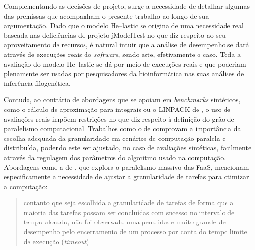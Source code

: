 \documentclass[english,brazilian]{UNISINOSmonografia} %
\begin{document}
Complementando as decisões de projeto, surge a necessidade de detalhar algumas das premissas que acompanham o presente trabalho ao longo de sua argumentação.
%
Dado que o modelo \textsf{He}--lastic se origina de uma necessidade real baseada nas deficiências do projeto jModelTest no que diz respeito ao seu aproveitamento de recursos, é natural intuir que a análise de desempenho se dará através de execuções reais do \textit{software}, sendo este, efetivamente o caso.
Toda a avaliação do modelo \textsf{He}--lastic se dá por meio de execuções reais e que poderiam plenamente ser usadas por pesquisadores da bioinformática nas suas análises de inferência filogenética.


Contudo, ao contrário de abordagens que se apoiam em \textit{benchmarks} sintéticos, como o cálculo de aproximação para integrais ou o LINPACK de , o uso de avaliações reais impõem restrições no que diz respeito à definição do grão de paralelismo computacional.
Trabalhos como o de  comprovam a importância da escolha adequada da granularidade em cenários de computação paralela e distribuída, podendo este ser ajustado, no caso de avaliações sintéticas, facilmente através da regulagem dos parâmetros do algoritmo usado na computação.
Abordagens como a de , que explora o paralelismo massivo das FaaS, mencionam especificamente a necessidade de ajustar a granularidade de tarefas para otimizar a computação:
\begin{quote}
	contanto que seja escolhida a granularidade de tarefas de forma que a maioria das tarefas possam ser concluídas com sucesso no intervalo de tempo alocado, não foi observada uma penalidade muito grande de desempenho pelo encerramento de um processo por conta do tempo limite de execução (\textit{timeout})
\end{quote}
\end{document}
